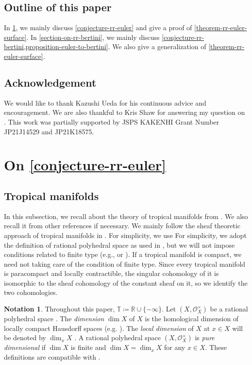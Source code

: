 \documentclass[a4paper,dvipdfmx,reqno,12pt]{amsart}
\theoremstyle{definition}
\newtheorem{notation}[theorem]{Notation}
\newcommand{\deq}{\coloneqq}
\numberwithin{equation}{section}
\begin{document}
\subsection{Outline of this paper}
In \cref{section-on-rr-euler}, we mainly
discuss \cref{conjecture-rr-euler} and
give a proof of \cref{theorem-rr-euler-surface}.
In \cref{section-on-rr-bertini}, we mainly
discuss \cref{conjecture-rr-bertini,proposition-euler-to-bertini}.
We also give a generalization of
\cref{theorem-rr-euler-surface}.

\subsection*{Acknowledgement}
We would like to thank Kazushi Ueda for his continuous advice
and encouragement. We are also thankful to Kris Shaw
for answering my question on
\cite{shaw2015tropical,demedrano2023chern}.
This work was partially supported 
by JSPS KAKENHI Grant Number JP21J14529 and JP21K18575.

\section{On \cref{conjecture-rr-euler}}
\label{section-on-rr-euler}
\subsection{Tropical manifolds}
In this subsection, we recall about 
the theory of tropical manifolds from
\cite{shaw2011tropical,MR3330789,mikhalkin2018tropical,MR4637248,demedrano2023chern}.
We also recall it from other references if necessary.
We mainly follow the sheaf theoretic approach of
tropical manifolds in \cite{MR4637248}.
For simplicity, we use 
For simplicity, we adopt the definition of
rational polyhedral space
as used in \cite[Definition 6.1]{gross2019sheaftheoretic},
but we will not impose conditions related to finite type 
(e.g., \cite[Definition 7.1.14]{mikhalkin2018tropical} 
or \cite[Definition 2.3 (4)]{demedrano2023chern}).
If a tropical manifold is compact, we need not
taking care of the condition of finite type. 
Since every tropical manifold is paracompact and
locally contractible, the singular cohomology
of it is isomorphic to the sheaf cohomology
of the constant sheaf on it, so we identify
the two cohomologies.

\begin{notation}
Throughout this paper, $\mathbb{T}\deq 
\mathbb{R}\cup\{-\infty\}$.
Let $(X,\mathcal{O}_X^{\times})$ be a rational
polyhedral space \cite[Definition 2.2]{MR4246795}.
The \emph{dimension} $\dim X$ of $X$ is 
the homological dimension of locally compact
Hausdorff spaces (e.g.
\cite[Chapter III. Definition 9.4]{MR842190}).
The \emph{local dimension} of $X$ at $x\in X$
will be denoted by $\dim_x X$
\cite[Chapter III. Definition 9.10]{MR842190}.
A rational polyhedral space $(X,\mathcal{O}_X^{\times})$
is \emph{pure dimensional} if $\dim X$ is finite and
$\dim X=\dim_x X$ for any $x\in X$.
These definitions are compatible with
\cite[Definition 7.1.1]{mikhalkin2018tropical}.
\end{notation}
\end{document}
